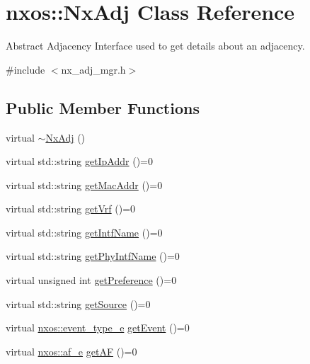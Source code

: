 \hypertarget{classnxos_1_1_nx_adj}{}\section{nxos\+:\+:Nx\+Adj Class Reference}
\label{classnxos_1_1_nx_adj}


Abstract Adjacency Interface used to get details about an adjacency.  




{\ttfamily \#include $<$nx\+\_\+adj\+\_\+mgr.\+h$>$}

\subsection*{Public Member Functions}
\begin{DoxyCompactItemize}
\item 
virtual \mbox{\hyperlink{classnxos_1_1_nx_adj_a308082669b2c45fe0bc3ae8ceedacdb6}{$\sim$\+Nx\+Adj}} ()
\item 
virtual std\+::string \mbox{\hyperlink{classnxos_1_1_nx_adj_a21e819518fd33c40436a6e2df427f064}{get\+Ip\+Addr}} ()=0
\item 
virtual std\+::string \mbox{\hyperlink{classnxos_1_1_nx_adj_ad35857c95529b40fbaf363bd6aebc0ec}{get\+Mac\+Addr}} ()=0
\item 
virtual std\+::string \mbox{\hyperlink{classnxos_1_1_nx_adj_a0928d29814a978c7b8b825fcc99b1fb1}{get\+Vrf}} ()=0
\item 
virtual std\+::string \mbox{\hyperlink{classnxos_1_1_nx_adj_ada50b00bb73ea35a3282481c949187d2}{get\+Intf\+Name}} ()=0
\item 
virtual std\+::string \mbox{\hyperlink{classnxos_1_1_nx_adj_aaf3b120882857af70467cd02dc01a844}{get\+Phy\+Intf\+Name}} ()=0
\item 
virtual unsigned int \mbox{\hyperlink{classnxos_1_1_nx_adj_a53629d8a995e5ab54ed63d175f5ab6cf}{get\+Preference}} ()=0
\item 
virtual std\+::string \mbox{\hyperlink{classnxos_1_1_nx_adj_a1f60bed95c387db33eba7ae4b48c965d}{get\+Source}} ()=0
\item 
virtual \mbox{\hyperlink{namespacenxos_af9a9040b7681199d386e94eb888018cb}{nxos\+::event\+\_\+type\+\_\+e}} \mbox{\hyperlink{classnxos_1_1_nx_adj_a75c503c316c39c12aa8b4c431c81d2de}{get\+Event}} ()=0
\item 
virtual \mbox{\hyperlink{namespacenxos_a3a667f48b94db10aa398940dc5bf72d7}{nxos\+::af\+\_\+e}} \mbox{\hyperlink{classnxos_1_1_nx_adj_a5e026c5187f3a88337790ad5d7cb4e5b}{get\+AF}} ()=0

\end{DoxyCompactItemize}
